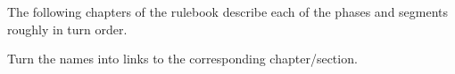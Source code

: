 \begin{designnote}
  The following chapters of the rulebook describe each of the phases and
  segments roughly in turn order.
\end{designnote}

\begin{todo}
  Turn the names into links to the corresponding chapter/section.
\end{todo}

\begin{multicols}{2}
  \GameSequence
\end{multicols}


